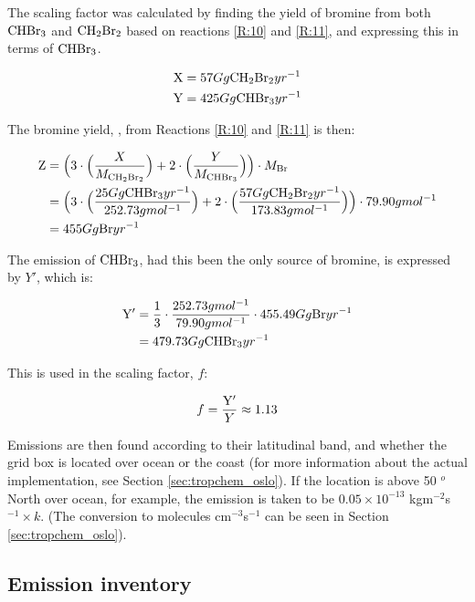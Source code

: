 \medskip

The scaling factor was calculated by finding the yield of bromine from both $\mathrm{CHBr_3}$ and $\mathrm{CH_2Br_2}$ based on reactions \ref{R:10} and \ref{R:11}, and expressing this in terms of $\mathrm{CHBr_3}$. 

\begin{align*}
    \mathrm{X} & = 57 Gg \mathrm{CH_2Br_2}yr^{-1} \\
    \mathrm{Y} & = 425 Gg \mathrm{CHBr_3}yr^{-1} 
\end{align*}

The bromine yield, , from Reactions \ref{R:10} and \ref{R:11} is then: 

\begin{align*}
    \mathrm{Z} & = \Big(3\cdot\Big(\frac{X}{M_{\mathrm{CH_2Br_2}}}\Big) + 2\cdot\Big(\frac{Y}{M_{\mathrm{CHBr_3}}}\Big)\Big)\cdot M_{\mathrm{Br}} \\
    & = \Big(3\cdot\Big(\frac{25 Gg \mathrm{CHBr_3}yr^{-1}}{252.73 g mol^{-1}}\Big) + 2\cdot\Big(\frac{57 Gg \mathrm{CH_2Br_2}yr^{-1}}{173.83 g mol^{-1}}\Big)\Big)\cdot79.90 g mol^{-1} \\
    & = 455 Gg\mathrm{Br}yr^{-1}
\end{align*}

The emission of $\mathrm{CHBr_3}$, had this been the only source of bromine, is expressed by $Y'$, which is: 

\begin{align*}
    \mathrm{Y'} & = \frac{1}{3}\cdot\frac{252.73 g mol^{-1}}{79.90 g mol^{-1}}\cdot455.49Gg\mathrm{Br}yr^{-1} \\
    & = 479.73 Gg \mathrm{CHBr_3}yr^{-1}
\end{align*}

This is used in the scaling factor, $f$:

\begin{equation*}
    f = \frac{\mathrm{Y'}}{Y} \approx 1.13
\end{equation*}


Emissions are then found according to their latitudinal band, and whether the grid box is located over ocean or the coast (for more information about the actual implementation, see Section \ref{sec:tropchem_oslo}). If the location is above 50 $^o$ North over ocean, for example, the emission is taken to be $0.05\times10^{-13}$ kgm$^{-2}$s$^{-1}\times k$. (The conversion to molecules cm$^{-3}$s$^{-1}$ can be seen in Section \ref{sec:tropchem_oslo}). 


\subsection{Emission inventory}

